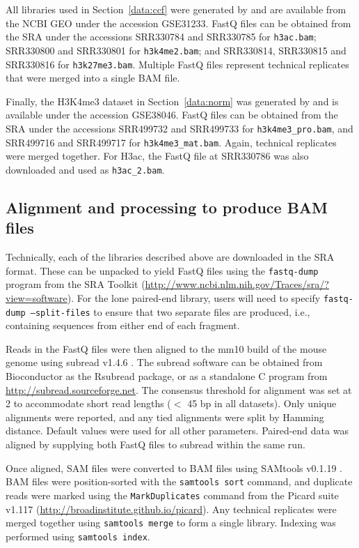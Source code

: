 \documentclass[12pt]{report}
\newcommand{\code}[1]{{\small\texttt{#1}}}
\begin{document}
All libraries used in Section~\ref{data:ccf} were generated by \cite{zhang2012} and are available from the NCBI GEO under the accession GSE31233. 
FastQ files can be obtained from the SRA under the accessions SRR330784 and SRR330785 for \code{h3ac.bam}; SRR330800 and SRR330801 for \code{h3k4me2.bam}; and SRR330814, SRR330815 and SRR330816 for \code{h3k27me3.bam}. 
Multiple FastQ files represent technical replicates that were merged into a single BAM file.

Finally, the H3K4me3 dataset in Section~\ref{data:norm} was generated by \cite{domingo2012} and is available under the accession GSE38046. 
FastQ files can be obtained from the SRA under the accessions SRR499732 and SRR499733 for \code{h3k4me3\_pro.bam}, and SRR499716 and SRR499717 for \code{h3k4me3\_mat.bam}. 
Again, technical replicates were merged together.
For H3ac, the FastQ file at SRR330786 was also downloaded and used as \code{h3ac\_2.bam}.
 
\subsection{Alignment and processing to produce BAM files}
Technically, each of the libraries described above are downloaded in the SRA format. 
These can be unpacked to yield FastQ files using the \code{fastq-dump} program from the SRA Toolkit (\url{http://www.ncbi.nlm.nih.gov/Traces/sra/?view=software}). 
For the lone paired-end library, users will need to specify \code{fastq-dump --split-files} to ensure that two separate files are produced, i.e., containing sequences from either end of each fragment.

Reads in the FastQ files were then aligned to the mm10 build of the mouse genome using subread v1.4.6 \citep{liao2013}. 
The subread software can be obtained from Bioconductor as the Rsubread package, or as a standalone C program from \url{http://subread.sourceforge.net}. 
The consensus threshold for alignment was set at 2 to accommodate short read lengths ($<$ 45 bp in all datasets).
Only unique alignments were reported, and any tied alignments were split by Hamming distance.
Default values were used for all other parameters.
Paired-end data was aligned by supplying both FastQ files to subread within the same run.

Once aligned, SAM files were converted to BAM files using SAMtools v0.1.19 \citep{li2009}. 
BAM files were position-sorted with the \code{samtools sort} command, and duplicate reads were marked using the \code{MarkDuplicates} command from the Picard suite v1.117 (\url{http://broadinstitute.github.io/picard}).
Any technical replicates were merged together using  \code{samtools merge} to form a single library. 
Indexing was performed using \code{samtools index}.
\end{document}
